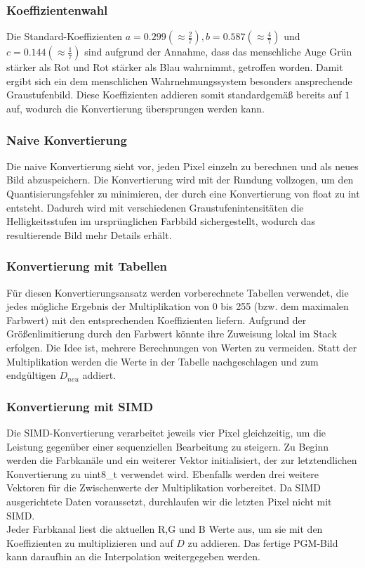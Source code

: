 \documentclass[course=erap]{aspdoc}
\begin{document}
\subsubsection{Koeffizientenwahl}
Die Standard-Koeffizienten $a = 0.299 (\approx \frac{2}{7}), b = 0.587 (\approx \frac{4}{7})$ und $c = 0.144 ( \approx \frac{1}{7})$ sind aufgrund der Annahme, dass das menschliche Auge Grün stärker als Rot und Rot stärker als Blau wahrnimmt, getroffen worden. Damit ergibt sich ein dem menschlichen Wahrnehmungssystem besonders ansprechende Graustufenbild. Diese Koeffizienten addieren somit standardgemäß bereits auf $1$ auf, wodurch die Konvertierung übersprungen werden kann. 


\subsubsection{Naive Konvertierung}
Die naive Konvertierung sieht vor, jeden Pixel einzeln zu berechnen und als neues Bild abzuspeichern. Die Konvertierung wird mit der Rundung vollzogen, um den Quantisierungsfehler zu minimieren, der durch eine Konvertierung von float zu int entsteht. Dadurch wird mit verschiedenen Graustufenintensitäten die Helligkeitsstufen im ursprünglichen Farbbild sichergestellt, wodurch das resultierende Bild mehr Details erhält.

\subsubsection{Konvertierung mit Tabellen}
Für diesen Konvertierungsansatz werden vorberechnete Tabellen verwendet, die jedes mögliche Ergebnis der Multiplikation von 0 bis 255 (bzw. dem maximalen Farbwert) mit den entsprechenden Koeffizienten liefern. Aufgrund der Größenlimitierung durch den Farbwert könnte ihre Zuweisung lokal im Stack erfolgen. Die Idee ist, mehrere Berechnungen von Werten zu vermeiden. Statt der Multiplikation werden die Werte in der Tabelle nachgeschlagen und zum endgültigen $D_{neu}$ addiert.

\subsubsection{Konvertierung mit SIMD}
Die SIMD-Konvertierung verarbeitet jeweils vier Pixel gleichzeitig, um die Leistung gegenüber einer sequenziellen Bearbeitung zu steigern. Zu Beginn werden die Farbkanäle und ein weiterer Vektor initialisiert, der zur letztendlichen Konvertierung zu uint8\_t verwendet wird. Ebenfalls werden drei weitere Vektoren für die Zwischenwerte der Multiplikation vorbereitet. Da SIMD ausgerichtete Daten voraussetzt, durchlaufen wir die letzten Pixel nicht mit SIMD.\\
Jeder Farbkanal liest die aktuellen R,G und B Werte aus, um sie mit den Koeffizienten zu multiplizieren und auf $D$ zu addieren. Das fertige PGM-Bild kann daraufhin an die Interpolation weitergegeben werden.
\end{document}
